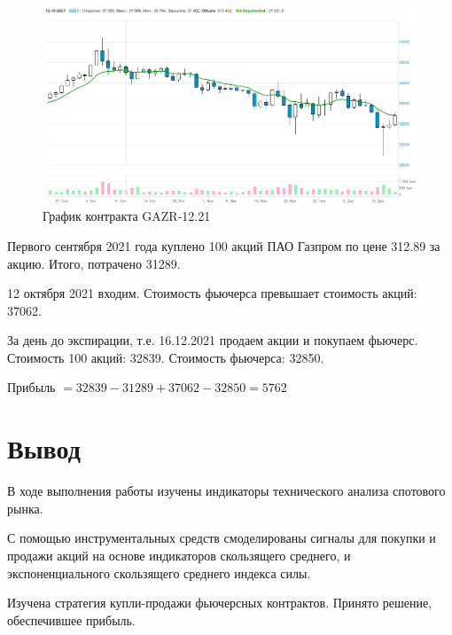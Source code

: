 \documentclass[14pt,a4paper]{extarticle}%
\begin{document}
\begin{figure}[H]
  \centering
  \includegraphics[scale=0.43]{GZZ1-plot.png}
  \caption{График контракта GAZR-12.21}
  \label{fig:GZZ1-plot}
\end{figure}

Первого сентября 2021 года куплено 100 акций ПАО Газпром по цене 312.89 за акцию.
Итого, потрачено 31289.

12 октября 2021 входим. Стоимость фьючерса превышает стоимость акций: 37062.

За день до экспирации, т.е. 16.12.2021 продаем акции и покупаем фьючерс.
Стоимость 100 акций: 32839. Стоимость фьючерса: 32850.

\begin{center}
  Прибыль $= 32839 - 31289 + 37062 - 32850 = 5762$
\end{center}


\section{Вывод}
В ходе выполнения работы изучены индикаторы технического анализа спотового рынка.

С помощью инструментальных средств смоделированы сигналы для покупки и продажи
акций на основе индикаторов скользящего среднего, и экспоненциального скользящего
среднего индекса силы.

Изучена стратегия купли-продажи фьючерсных контрактов. Принято решение,
обеспечившее прибыль.
\end{document}
